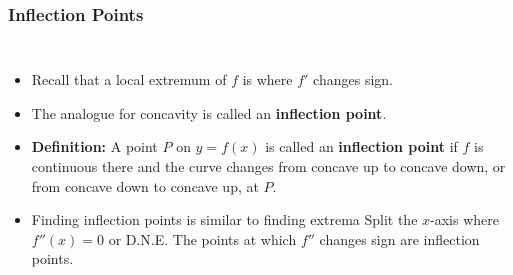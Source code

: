 \documentclass[serif,ignorenonframetext]{beamer}
\begin{document}
\begin{frame}
\begin{columns}
  \end{columns}
\end{frame}

\begin{frame}
  \frametitle{Inflection Points}
  \begin{columns}
  \begin{itemize}[<+->]
  \item Recall that a local extremum of $f$
    is where $f'$ changes sign.
  \item The analogue for concavity is called an 
    \textbf{inflection point}.
  \item \textbf{Definition:} A point $P$ on
    $y=f(x)$ is called an \textbf{inflection point}
    if $f$ is continuous there and the curve changes
    from concave up to concave down, or from concave
    down to concave up, at $P$.
  \item Finding inflection points is 
    similar to finding extrema
    Split the $x$-axis
    where $f''(x)=0$ or D.N.E.
    The points at which $f''$ changes sign 
    are inflection points.
  \end{itemize}
  \end{columns}
\end{frame}
\end{document}
